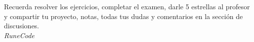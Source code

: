 \documentclass{article}
\begin{document}
Recuerda resolver los ejercicios, completar el examen, darle 5 estrellas al
profesor y compartir tu proyecto, notas, todas tus dudas y comentarios en la
sección de discusiones.\\
































\vspace{2cm}
\LARGE\textit{RuneCode}
\end{document}
